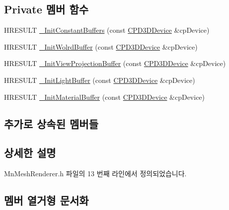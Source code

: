 \subsection*{Private 멤버 함수}
\begin{DoxyCompactItemize}
\item 
H\+R\+E\+S\+U\+LT \hyperlink{class_m_n_l_1_1_mn_mesh_renderer_ac3396a1345d35c5e52481818eb86b393}{\+\_\+\+Init\+Constant\+Buffers} (const \hyperlink{namespace_m_n_l_a1eec210db8f309a4a9ac0d9658784c31}{C\+P\+D3\+D\+Device} \&cp\+Device)
\item 
H\+R\+E\+S\+U\+LT \hyperlink{class_m_n_l_1_1_mn_mesh_renderer_aba7a3676a4b264a813b64f05e06ac11c}{\+\_\+\+Init\+Wolrd\+Buffer} (const \hyperlink{namespace_m_n_l_a1eec210db8f309a4a9ac0d9658784c31}{C\+P\+D3\+D\+Device} \&cp\+Device)
\item 
H\+R\+E\+S\+U\+LT \hyperlink{class_m_n_l_1_1_mn_mesh_renderer_aa48062a8d90af6b41fc06c6cd4a8dadd}{\+\_\+\+Init\+View\+Projection\+Buffer} (const \hyperlink{namespace_m_n_l_a1eec210db8f309a4a9ac0d9658784c31}{C\+P\+D3\+D\+Device} \&cp\+Device)
\item 
H\+R\+E\+S\+U\+LT \hyperlink{class_m_n_l_1_1_mn_mesh_renderer_a8beea41d6ea1f0061d495ed7cca05926}{\+\_\+\+Init\+Light\+Buffer} (const \hyperlink{namespace_m_n_l_a1eec210db8f309a4a9ac0d9658784c31}{C\+P\+D3\+D\+Device} \&cp\+Device)
\item 
H\+R\+E\+S\+U\+LT \hyperlink{class_m_n_l_1_1_mn_mesh_renderer_a1478d6e5f9244bd15087fa2271a03420}{\+\_\+\+Init\+Material\+Buffer} (const \hyperlink{namespace_m_n_l_a1eec210db8f309a4a9ac0d9658784c31}{C\+P\+D3\+D\+Device} \&cp\+Device)
\end{DoxyCompactItemize}
\subsection*{추가로 상속된 멤버들}


\subsection{상세한 설명}


Mn\+Mesh\+Renderer.\+h 파일의 13 번째 라인에서 정의되었습니다.



\subsection{멤버 열거형 문서화}
\mbox{\label{class_m_n_l_1_1_mn_mesh_renderer_aac99491a7ab8269b32ac0e7d979fc501}} 
